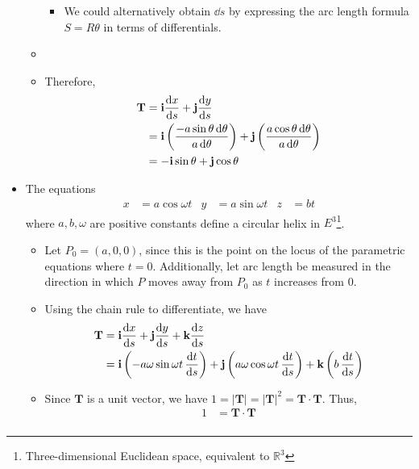 \documentclass[../main.tex]{subfiles}
\begin{document}
\begin{itemize}
\begin{itemize}
\begin{itemize}
            \item We could alternatively obtain $\dd{s}$ by expressing the arc length formula $S=R\theta$ in terms of differentials.
        \end{itemize}
        \item {}
        \item Therefore,
        \begin{align*}
            \textbf{T} &= \textbf{i}\dv{x}{s}+\textbf{j}\dv{y}{s}\\
            &= \textbf{i}\left( \frac{-a\sin\theta\dd{\theta}}{a\dd{\theta}} \right)+\textbf{j}\left( \frac{a\cos\theta\dd{\theta}}{a\dd{\theta}} \right)\\
            &= -\textbf{i}\sin\theta+\textbf{j}\cos\theta
        \end{align*}
    \end{itemize}
    \item The equations
    \begin{align*}
        x &= a\cos\omega t&
            y &= a\sin\omega t&
                z &= bt
    \end{align*}
    where $a,b,\omega$ are positive constants define a circular helix in $E^3$\footnote{Three-dimensional Euclidean space, equivalent to $\mathbb{R}^3$}.
    \begin{itemize}
        \item Let $P_0=(a,0,0)$, since this is the point on the locus of the parametric equations where $t=0$. Additionally, let arc length be measured in the direction in which $P$ moves away from $P_0$ as $t$ increases from 0.
        \item Using the chain rule to differentiate, we have
        \begin{align*}
            \textbf{T} &= \textbf{i}\dv{x}{s}+\textbf{j}\dv{y}{s}+\textbf{k}\dv{z}{s}\\
            &= \textbf{i}\left( -a\omega\sin\omega t\, \dv{t}{s} \right)+\textbf{j}\left( a\omega\cos\omega t\, \dv{t}{s} \right)+\textbf{k}\left( b\, \dv{t}{s} \right)
        \end{align*}
        \item Since $\textbf{T}$ is a unit vector, we have $1=|\textbf{T}|=|\textbf{T}|^2=\textbf{T}\cdot\textbf{T}$. Thus,
        \begin{align*}
            1 &= \textbf{T}\cdot\textbf{T}\\

\end{align*}
\end{itemize}
\end{itemize}
\end{document}
